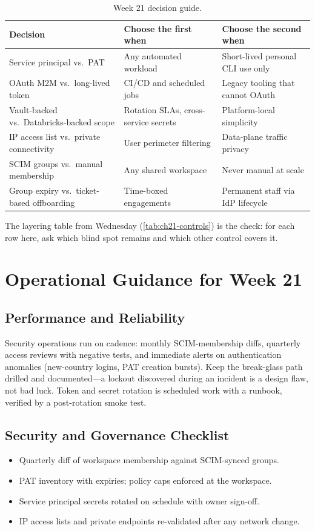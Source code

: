 \begin{table}[H]
\centering
\small
\begin{tabular}{@{}p{3.4cm}p{4.4cm}p{4.6cm}@{}}
\toprule
\textbf{Decision} & \textbf{Choose the first when} & \textbf{Choose the second when} \\
\midrule
Service principal vs.\ PAT & Any automated workload & Short-lived personal CLI use only \\
OAuth M2M vs.\ long-lived token & CI/CD and scheduled jobs & Legacy tooling that cannot OAuth \\
Vault-backed vs.\ Databricks-backed scope & Rotation SLAs, cross-service secrets & Platform-local simplicity \\
IP access list vs.\ private connectivity & User perimeter filtering & Data-plane traffic privacy \\
SCIM groups vs.\ manual membership & Any shared workspace & Never manual at scale \\
Group expiry vs.\ ticket-based offboarding & Time-boxed engagements & Permanent staff via IdP lifecycle \\
\bottomrule
\end{tabular}
\caption{Week 21 decision guide.}
\label{tab:ch21-decisions}
\end{table}

The layering table from Wednesday (\cref{tab:ch21-controls}) is the check: for each row here, ask which blind spot remains and which other control covers it.

\section{Operational Guidance for Week 21}
%
\subsection{Performance and Reliability}
Security operations run on cadence: monthly SCIM-membership diffs, quarterly access reviews with negative tests, and immediate alerts on authentication anomalies (new-country logins, PAT creation bursts). Keep the break-glass path drilled and documented---a lockout discovered during an incident is a design flaw, not bad luck. Token and secret rotation is scheduled work with a runbook, verified by a post-rotation smoke test.

\subsection{Security and Governance Checklist}
\begin{itemize}
    \item Quarterly diff of workspace membership against SCIM-synced groups.
    \item PAT inventory with expiries; policy caps enforced at the workspace.
    \item Service principal secrets rotated on schedule with owner sign-off.
    \item IP access lists and private endpoints re-validated after any network change.
\end{itemize}

